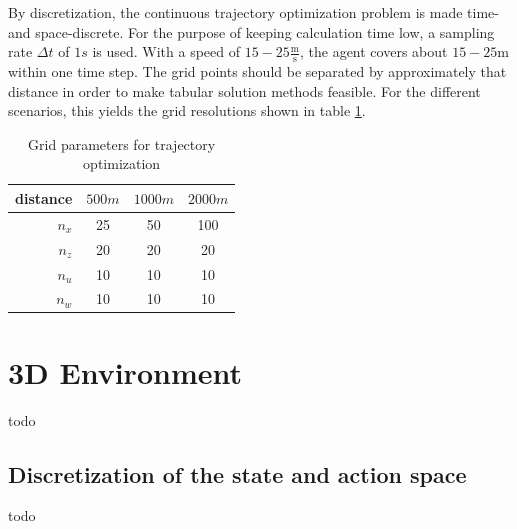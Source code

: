 By discretization, the continuous trajectory optimization problem is made time- and space-discrete. For the purpose of keeping calculation time low, a sampling rate $\Delta t$ of $1s$ is used. With a speed of $15-25 \frac{\text{m}}{\text{s}}$, the agent covers about $15-25\text{m}$ within one time step. The grid points should be separated by approximately that distance in order to make tabular solution methods feasible. For the different scenarios, this yields the grid resolutions shown in table \ref{tab:grids}.
\begin{table}
	\begin{center}
		\begin{tabular}{r|c c c}
			distance & $500m$ & $1000m$ & $2000m$ \\ \hline
			$n_x$ & 25 & 50 & 100 \\
			$n_z$ & 20 & 20 & 20 \\
			$n_u$ & 10 & 10 & 10 \\
			$n_w$ & 10 & 10 & 10
		\end{tabular}
		\caption{Grid parameters for trajectory optimization}
		\label{tab:grids}
	\end{center}
\end{table}

\section{3D Environment}

todo

\subsection{Discretization of the state and action space}
\label{sec:disc3d}
todo